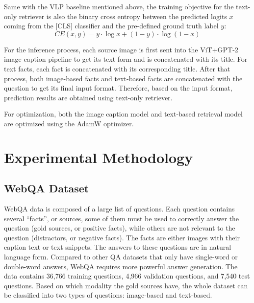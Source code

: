 \documentclass[nohyperref]{article}
\theoremstyle{plain}
\theoremstyle{definition}
\theoremstyle{remark}
\begin{document}
Same with the VLP baseline mentioned above, the training objective for the text-only retriever is also the binary cross entropy between the predicted logits $x$ coming from the [CLS] classifier and the pre-defined ground truth label $y$:
\begin{equation}
CE(x, y) = y \cdot \log x + (1 - y) \cdot \log (1 - x)
\end{equation}

For the inference process, each source image is first sent into the ViT+GPT-2 image caption pipeline to get its text form and is concatenated with its title. For text facts, each fact is concatenated with its corresponding title. After that process, both image-based facts and text-based facts are concatenated with the question to get its final input format. Therefore, based on the input format, prediction results are obtained using text-only retriever.\par

For optimization, both the image caption model and text-based retrieval model are optimized using the AdamW optimizer.

\section{Experimental Methodology}

\subsection{WebQA Dataset}

WebQA data \cite{webqa} is composed of a large list of questions. Each question contains several ``facts'', or sources, some of them must be used to correctly answer the question (gold sources, or positive facts), while others are not relevant to the question (distractors, or negative facts). The facts are either images with their caption text or text snippets.
The answers to these questions are in natural language form. Compared to other QA datasets that only have single-word or double-word answers, WebQA requires more powerful answer generation.
The data contains 36,766 training questions,  4,966 validation questions, and 7,540 test questions.
Based on which modality the gold sources have, the whole dataset can be classified into two types of questions: image-based and text-based.
\end{document}
